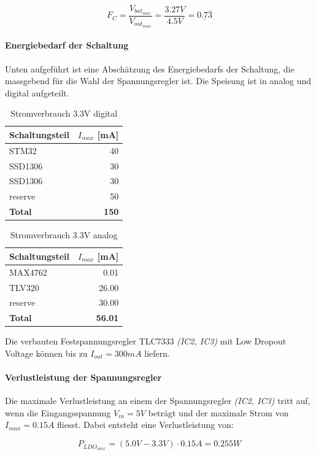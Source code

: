 \begin{equation}
F_C=\frac{V_{bat_{max}}}{V_{out_{max}}}=\frac{3.27\si{V}}{4.5\si{V}}=\underline{0.7\bar{3}}
\end{equation}

\paragraph{Energiebedarf der Schaltung}

Unten aufgeführt ist eine Abschätzung des Energiebedarfs der Schaltung, die massgebend für die Wahl der Spannungsregler ist. Die Speisung ist in analog und digital aufgeteilt.

\begin{table}[H]
\centering
\begin{tabular}{|l|r|}
\hline
\textbf{Schaltungsteil} & \textbf{$I_{max}$ {[}\si{mA}{]}} \\ \hline
STM32                   & 40                     \\ \hline
SSD1306                 & 30                     \\ \hline
SSD1306                 & 30                     \\ \hline
reserve                 & 50                     \\ \hline
\textbf{Total}          & \textbf{150}          \\ \hline
\end{tabular}
\caption{Stromverbrauch 3.3V digital}
\end{table}

\begin{table}[H]
\centering
\begin{tabular}{|l|r|}
\hline
\textbf{Schaltungsteil} & \textbf{$I_{max}$ {[}\si{mA}{]}} \\ \hline
MAX4762                 & 0.01                   \\ \hline
TLV320                  & 26.00                  \\ \hline
reserve                 & 30.00                  \\ \hline
\textbf{Total}          & \textbf{56.01}        \\ \hline
\end{tabular}
\caption{Stromverbrauch 3.3V analog}
\end{table}

Die verbauten Festspannungsregler TLC7333 \textit{(IC2, IC3)} mit Low Dropout Voltage können bis zu ${I_{out}=300\si{mA}}$ liefern.

\paragraph{Verlustleistung der Spannungsregler}

Die maximale Verlustleistung an einem der Spannungsregler \textit{(IC2, IC3)} tritt auf, wenn die Eingangsspannung ${V_{in}=5\si{V}}$ beträgt und der maximale Strom von ${I_{max}=0.15\si{A}}$ fliesst.
Dabei entsteht eine Verlustleistung von:

\begin{equation}
P_{LDO_{max}}=(5.0\si{V}-3.3\si{V})\cdot 0.15\si{A}=0.255\si{W}
\end{equation}

